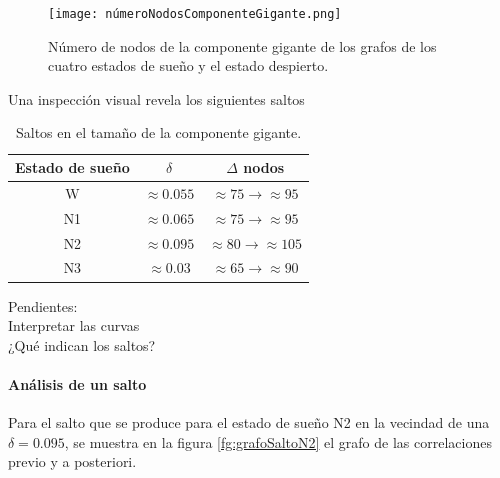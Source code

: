 \documentclass{article}
\begin{document}
\begin{figure}[ht]
  \centering
  \texttt{[image: númeroNodosComponenteGigante.png]}
  \caption{Número de nodos de la componente gigante de los grafos de los cuatro estados de sueño y el estado despierto.
	}
	\label{fg:númeroNodosComponenteGigante}
\end{figure}

Una inspección visual revela los siguientes saltos

\begin{table}[ht]
	\centering
\begin{tabular}{ccc}
	\toprule
	Estado de sueño & $\delta$  & $\Delta$ nodos \\
	\midrule
	W & $\approx 0.055$ &  $\approx 75 \rightarrow \approx 95$ \\
	N1 & $\approx 0.065$ &  $\approx 75 \rightarrow \approx 95$ \\
	N2 & $\approx 0.095$ &  $\approx 80 \rightarrow \approx 105$ \\
	N3 & $\approx 0.03$ &  $\approx 65 \rightarrow \approx 90$ \\
	\bottomrule
\end{tabular}
\bigskip
\caption{Saltos en el tamaño de la componente gigante.}
\label{tb:saltos}
\end{table}

Pendientes:\\
Interpretar las curvas\\
¿Qué indican los saltos?


\paragraph{Análisis de un salto}
%

Para el salto que se produce para el estado de sueño N2 en la vecindad de una $\delta = 0.095$, se muestra en la figura \ref{fg:grafoSaltoN2} el grafo de las correlaciones previo y a posteriori.
\end{document}

